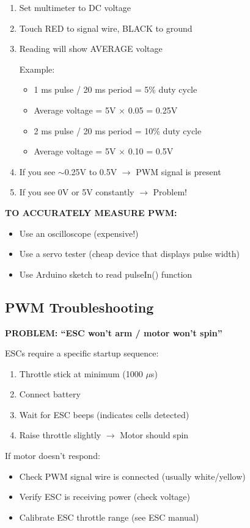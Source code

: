 \documentclass[11pt,letterpaper]{article}
\begin{document}
\begin{enumerate}
\item Set multimeter to DC voltage
\item Touch RED to signal wire, BLACK to ground
\item Reading will show AVERAGE voltage

Example:
\begin{itemize}[nosep]
\item 1 ms pulse / 20 ms period = 5\% duty cycle
\item Average voltage = 5V $\times$ 0.05 = 0.25V
\item 2 ms pulse / 20 ms period = 10\% duty cycle
\item Average voltage = 5V $\times$ 0.10 = 0.5V
\end{itemize}

\item If you see $\sim$0.25V to 0.5V $\rightarrow$ PWM signal is present
\item If you see 0V or 5V constantly $\rightarrow$ Problem!
\end{enumerate}

\textbf{TO ACCURATELY MEASURE PWM:}
\begin{itemize}
\item Use an oscilloscope (expensive!)
\item Use a servo tester (cheap device that displays pulse width)
\item Use Arduino sketch to read pulseIn() function
\end{itemize}

\subsection{PWM Troubleshooting}

\textbf{PROBLEM: ``ESC won't arm / motor won't spin''}

ESCs require a specific startup sequence:
\begin{enumerate}[nosep]
\item Throttle stick at minimum (1000 $\mu$s)
\item Connect battery
\item Wait for ESC beeps (indicates cells detected)
\item Raise throttle slightly $\rightarrow$ Motor should spin
\end{enumerate}

If motor doesn't respond:
\begin{itemize}[nosep]
\item Check PWM signal wire is connected (usually white/yellow)
\item Verify ESC is receiving power (check voltage)
\item Calibrate ESC throttle range (see ESC manual)
\end{itemize}
\end{document}

